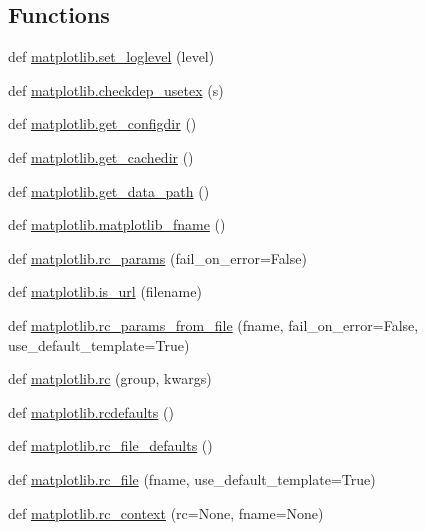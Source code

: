 \subsection*{Functions}
\begin{DoxyCompactItemize}
\item 
def \hyperlink{namespacematplotlib_a94c699cfaea1ae4b7804dda4ef2e42e3}{matplotlib.\+set\+\_\+loglevel} (level)
\item 
def \hyperlink{namespacematplotlib_ae3f7a6228bd1dfa27450b84c15a72622}{matplotlib.\+checkdep\+\_\+usetex} (s)
\item 
def \hyperlink{namespacematplotlib_a11f4d6a19e0e0713ebabacc8ececcad3}{matplotlib.\+get\+\_\+configdir} ()
\item 
def \hyperlink{namespacematplotlib_a18b054937ee2f63168bd0a53003961d5}{matplotlib.\+get\+\_\+cachedir} ()
\item 
def \hyperlink{namespacematplotlib_abefd06dc245b2239a4e6eae74a5c60df}{matplotlib.\+get\+\_\+data\+\_\+path} ()
\item 
def \hyperlink{namespacematplotlib_a9015b2634e8d2968848f7fda64436242}{matplotlib.\+matplotlib\+\_\+fname} ()
\item 
def \hyperlink{namespacematplotlib_af635acac141b4caa451dd53c94109c07}{matplotlib.\+rc\+\_\+params} (fail\+\_\+on\+\_\+error=False)
\item 
def \hyperlink{namespacematplotlib_a617194912be38b02290e2ede1d18edf5}{matplotlib.\+is\+\_\+url} (filename)
\item 
def \hyperlink{namespacematplotlib_abeb932db9ebc701d700b548f24f47809}{matplotlib.\+rc\+\_\+params\+\_\+from\+\_\+file} (fname, fail\+\_\+on\+\_\+error=False, use\+\_\+default\+\_\+template=True)
\item 
def \hyperlink{namespacematplotlib_a16931c23a19f81a6b22a97ec0bca1c1c}{matplotlib.\+rc} (group, kwargs)
\item 
def \hyperlink{namespacematplotlib_a28b1fc62c2abee97ce803d8238bacd67}{matplotlib.\+rcdefaults} ()
\item 
def \hyperlink{namespacematplotlib_abab7e1391fed4a96aba56fa0f1ad9fe9}{matplotlib.\+rc\+\_\+file\+\_\+defaults} ()
\item 
def \hyperlink{namespacematplotlib_aabe501013cd5d503cbb1aca4e0c0141e}{matplotlib.\+rc\+\_\+file} (fname, use\+\_\+default\+\_\+template=True)
\item 
def \hyperlink{namespacematplotlib_a72f32e32fe5a555b733ea38fc472335e}{matplotlib.\+rc\+\_\+context} (rc=None, fname=None)
\item 

\end{DoxyCompactItemize}
